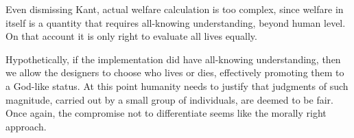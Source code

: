 Even dismissing Kant, actual welfare calculation is too complex, since welfare in itself is a quantity that requires all-knowing understanding, beyond human level.
On that account it is only right to evaluate all lives equally.

Hypothetically, if the implementation did have all-knowing understanding, then we
allow the designers to choose who lives or dies, effectively promoting them to a God-like status. At this point humanity needs to justify that judgments of such magnitude,
carried out by a small group of individuals, are deemed to be fair.
Once again, the compromise not to differentiate seems like the morally right approach.

